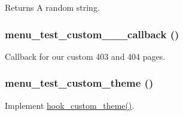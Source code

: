 \begin{DoxyReturn}{Returns}
A random string. 
\end{DoxyReturn}
\hypertarget{menu__test_8module_a5c84683c45f61be595a1cea973278709}{
\subsubsection[{menu\_\-test\_\-custom\_\-403\_\-404\_\-callback}]{\setlength{\rightskip}{0pt plus 5cm}menu\_\-test\_\-custom\_\_\_\-callback ()}}
\label{menu__test_8module_a5c84683c45f61be595a1cea973278709}
Callback for our custom 403 and 404 pages. \hypertarget{menu__test_8module_aa75fd3dbb63b7bdcf82616dfa3aeab27}{
\subsubsection[{menu\_\-test\_\-custom\_\-theme}]{\setlength{\rightskip}{0pt plus 5cm}menu\_\-test\_\-custom\_\-theme ()}}
\label{menu__test_8module_aa75fd3dbb63b7bdcf82616dfa3aeab27}
Implement \hyperlink{group__hooks_gab83dce4ef80bc5005ee0de98fc005b1f}{hook\_\-custom\_\-theme()}.

